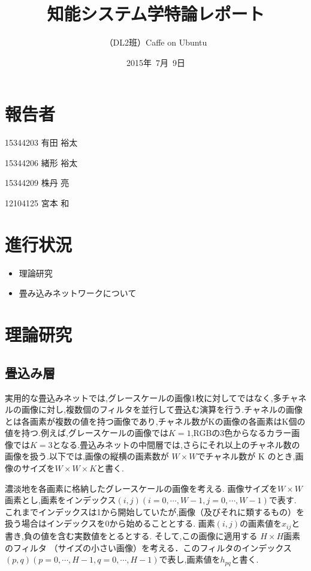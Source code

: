\documentclass[a4paper,10pt]{jsarticle}
\title{知能システム学特論レポート}
\author{
（DL2班）Caffe on Ubuntu\\
}
\date{2015年\ 7月\ 9日}
\begin{document}
\maketitle
\section{報告者}
\begin{list}{}{}
 \item 15344203\hspace{0.5cm} 有田 裕太
 \item 15344206\hspace{0.5cm} 緒形 裕太
 \item 15344209\hspace{0.5cm} 株丹 亮
 \item 12104125\hspace{0.5cm} 宮本 和
\end{list}

\section{進行状況}

\begin{itemize}
\item 理論研究
\item 畳み込みネットワークについて
\end{itemize}

\section{理論研究}

\subsection{畳込み層}

実用的な畳込みネットでは,グレースケールの画像1枚に対してではなく,多チャネルの画像に対し,複数個のフィルタを並行して畳込む演算を行う.チャネルの画像とは各画素が複数の値を持つ画像であり,チャネル数がKの画像の各画素はK個の値を持つ.例えば,グレースケールの画像では$K = 1$,RGBの3色からなるカラー画像では$K = 3$となる.畳込みネットの中間層では,さらにそれ以上のチャネル数の画像を扱う.以下では,画像の縦横の画素数が $W \times W$でチャネル数が K のとき,画像のサイズを$W \times W \times K$と書く.

濃淡地を各画素に格納したグレースケールの画像を考える.
画像サイズを$W\times W$画素とし,画素をインデックス$(i,j)(i = 0,\cdots,W-1, j = 0,\cdots,W-1)$で表す.
これまでインデックスは1から開始していたが,画像（及びそれに類するもの）を扱う場合はインデックスを0から始めることとする.
画素$(i,j)$の画素値を$x_{ij}$と書き,負の値を含む実数値をとるとする.
そして,この画像に適用する $H\times H$画素のフィルタ
（サイズの小さい画像）を考える．このフィルタのインデックス$(p,q)(p=0,\cdots,H-1, q=0,\cdots,H-1)$で表し,画素値を$h_{pq}$と書く.
\end{document}
